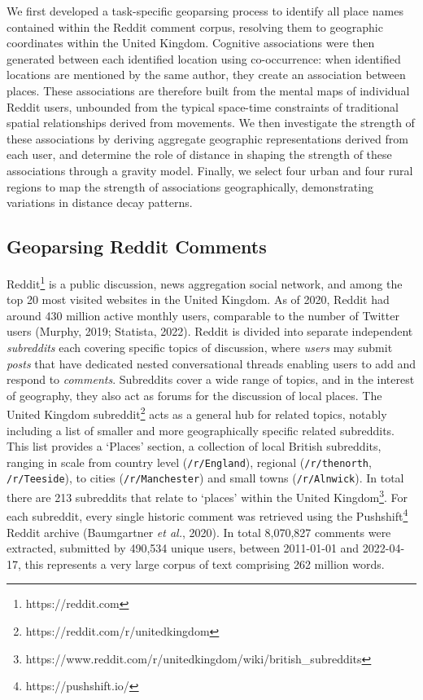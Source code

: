 \documentclass[
  letterpaper,
  11pt,
  english,
  onehalfspacing,
  headsepline]{MastersDoctoralThesis}
\begin{document}
We first developed a task-specific geoparsing process to identify all
place names contained within the Reddit comment corpus, resolving them
to geographic coordinates within the United Kingdom. Cognitive
associations were then generated between each identified location using
co-occurrence: when identified locations are mentioned by the same
author, they create an association between places. These associations
are therefore built from the mental maps of individual Reddit users,
unbounded from the typical space-time constraints of traditional spatial
relationships derived from movements. We then investigate the strength
of these associations by deriving aggregate geographic representations
derived from each user, and determine the role of distance in shaping
the strength of these associations through a gravity model. Finally, we
select four urban and four rural regions to map the strength of
associations geographically, demonstrating variations in distance decay
patterns.

\hypertarget{geoparsing-reddit-comments}{%
\subsection{Geoparsing Reddit
Comments}\label{geoparsing-reddit-comments}}

Reddit\footnote{https://reddit.com} is a public discussion, news
aggregation social network, and among the top 20 most visited websites
in the United Kingdom. As of 2020, Reddit had around 430 million active
monthly users, comparable to the number of Twitter users (Murphy, 2019;
Statista, 2022). Reddit is divided into separate independent
\emph{subreddits} each covering specific topics of discussion, where
\emph{users} may submit \emph{posts} that have dedicated nested
conversational threads enabling users to add and respond to
\emph{comments}. Subreddits cover a wide range of topics, and in the
interest of geography, they also act as forums for the discussion of
local places. The United Kingdom subreddit\footnote{https://reddit.com/r/unitedkingdom}
acts as a general hub for related topics, notably including a list of
smaller and more geographically specific related subreddits. This list
provides a `Places' section, a collection of local British subreddits,
ranging in scale from country level (\texttt{/r/England}), regional
(\texttt{/r/thenorth}, \texttt{/r/Teeside}), to cities
(\texttt{/r/Manchester}) and small towns (\texttt{/r/Alnwick}). In total
there are 213 subreddits that relate to `places' within the United
Kingdom\footnote{https://www.reddit.com/r/unitedkingdom/wiki/british\_subreddits}.
For each subreddit, every single historic comment was retrieved using
the Pushshift\footnote{https://pushshift.io/} Reddit archive
(Baumgartner \emph{et al.}, 2020). In total 8,070,827 comments were
extracted, submitted by 490,534 unique users, between 2011-01-01 and
2022-04-17, this represents a very large corpus of text comprising 262
million words.
\end{document}
